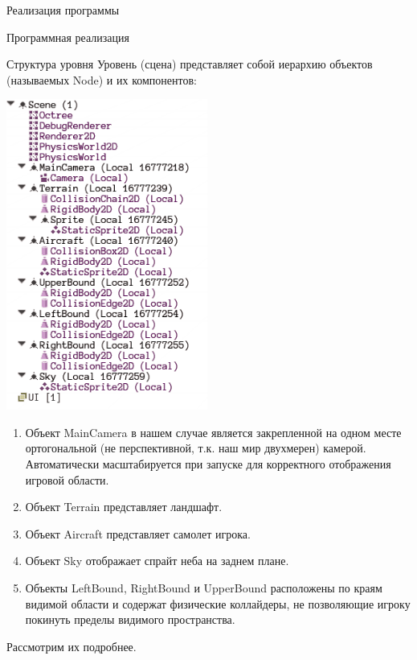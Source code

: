 \documentclass[12pt, a4paper]{article}
\begin{document}
\begin{section}{Реализация программы}
\begin{subsection}{Программная реализация}
			\clearpage
			\begin{subsubsection}{Структура уровня}
				Уровень (сцена) представляет собой иерархию объектов (называемых Node) и их компонентов:

				\includegraphics[width=250]{scene}

				\begin{enumerate}
					\item Объект MainCamera в нашем случае является закрепленной на одном месте ортогональной (не перспективной, т.к. наш мир двухмерен) камерой.
					Автоматически масштабируется при запуске для корректного отображения игровой области.
					\item Объект Terrain представляет ландшафт.
					\item Объект Aircraft представляет самолет игрока.
					\item Объект Sky отображает спрайт неба на заднем плане.
					\item Объекты LeftBound, RightBound и UpperBound расположены по краям видимой области и содержат физические коллайдеры, не позволяющие игроку покинуть пределы видимого пространства.
				\end{enumerate}

				Рассмотрим их подробнее.
			\end{subsubsection}


\end{subsection}
\end{section}
\end{document}
